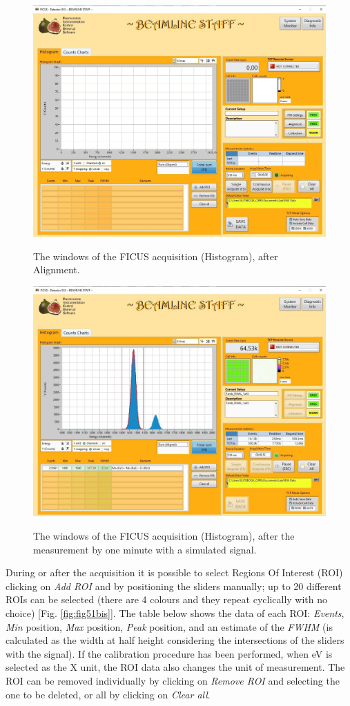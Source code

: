 \documentclass[a4paper,12pt,oneside,pdflatex,italian,final,twocolumn]{article}
\begin{document}
\begin{figure}[h!]
\centering
{\includegraphics[width=.85\textwidth]{Cattura90.jpg}} \quad
\caption{The windows of the FICUS acquisition (Histogram), after Alignment.}\label{fig:fig50}
\end{figure}

\begin{figure}[h!]
\centering
{\includegraphics[width=.85\textwidth]{Cattura98.jpg}} \quad
\caption{The windows of the FICUS acquisition (Histogram), after the measurement by one minute with a simulated signal.}\label{fig:fig51}
\end{figure}

\clearpage

During or after the acquisition it is possible to select Regions Of Interest (ROI) clicking on \textit{Add ROI} and by positioning the sliders manually; up to 20 different ROIs can be selected (there are 4 colours and they repeat cyclically with no choice) [Fig. \ref{fig:fig51bis}]. 
The table below shows the data of each ROI: \textit{Events}, \textit{Min} position, \textit{Max} position, \textit{Peak} position, and an estimate of the \textit{FWHM} (is calculated as the width at half height considering the intersections of the sliders with the signal). 
If the calibration procedure has been performed, when eV is selected as the X unit, the ROI data also changes the unit of measurement.
The ROI can be removed individually by clicking on \textit{Remove ROI} and selecting the one to be deleted, or all by clicking on \textit{Clear all}.
\end{document}
